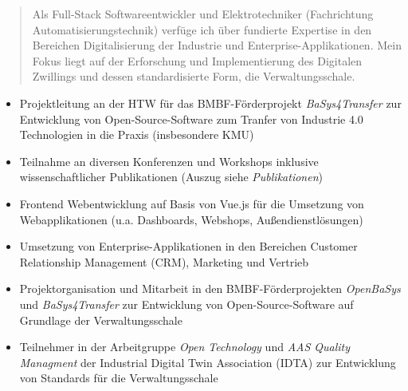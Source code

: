 \documentclass[10pt,a4paper,ragged2e,withhyper]{altacv}
\begin{document}
\begin{paracol}{2}
        \vspace{-6pt}
            \begin{quote}
                Als Full-Stack Softwareentwickler und Elektrotechniker (Fachrichtung Automatisierungstechnik) verfüge ich über fundierte Expertise in den Bereichen Digitalisierung der Industrie und Enterprise-Applikationen.
                Mein Fokus liegt auf der Erforschung und Implementierung des Digitalen Zwillings und dessen standardisierte Form, die Verwaltungsschale.
            \end{quote}
        
            \begin{itemize}
                \item Projektleitung an der HTW für das BMBF-Förderprojekt \textit{BaSys4Transfer} zur Entwicklung von Open-Source-Software zum Tranfer von Industrie 4.0 Technologien in die Praxis (insbesondere KMU)
                \item Teilnahme an diversen Konferenzen und Workshops inklusive wissenschaftlicher Publikationen (Auszug siehe \textit{Publikationen})
            \end{itemize}
            \divider

            \begin{itemize}
                \item Frontend Webentwicklung auf Basis von Vue.js für die Umsetzung von Webapplikationen (u.a. Dashboards, Webshops, Außendienstlösungen)
                \item Umsetzung von Enterprise-Applikationen in den Bereichen Customer Relationship Management (CRM), Marketing und Vertrieb
            \end{itemize}
            \divider

            \begin{itemize}
                \item Projektorganisation und Mitarbeit in den BMBF-Förderprojekten \textit{OpenBaSys}\\ und \textit{BaSys4Transfer} zur Entwicklung von Open-Source-Software auf Grundlage der Verwaltungsschale
                \item Teilnehmer in der Arbeitgruppe \textit{Open Technology} und \textit{AAS Quality Managment} der Industrial Digital Twin Association (IDTA) zur Entwicklung von Standards für die Verwaltungsschale
            \end{itemize}
            \divider


\end{paracol}
\end{document}
